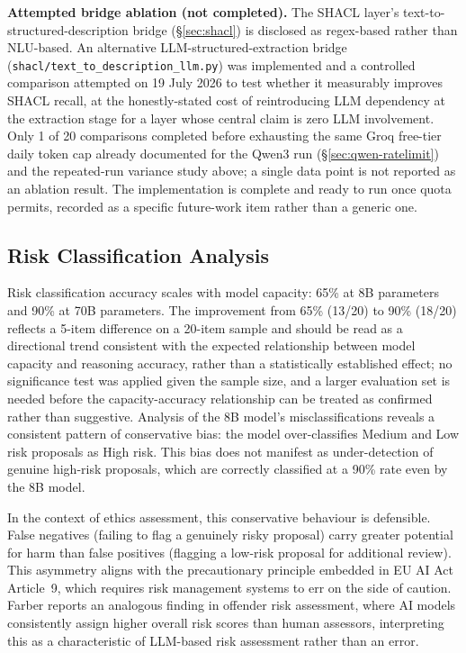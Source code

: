 \textbf{Attempted bridge ablation (not completed).} The SHACL layer's text-to-structured-description bridge (\S\ref{sec:shacl}) is disclosed as regex-based rather than NLU-based. An alternative LLM-structured-extraction bridge (\texttt{shacl/text\_to\_description\_llm.py}) was implemented and a controlled comparison attempted on 19 July 2026 to test whether it measurably improves SHACL recall, at the honestly-stated cost of reintroducing LLM dependency at the extraction stage for a layer whose central claim is zero LLM involvement. Only 1 of 20 comparisons completed before exhausting the same Groq free-tier daily token cap already documented for the Qwen3 run (\S\ref{sec:qwen-ratelimit}) and the repeated-run variance study above; a single data point is not reported as an ablation result. The implementation is complete and ready to run once quota permits, recorded as a specific future-work item rather than a generic one.


\subsection{Risk Classification Analysis}
\label{sec:risk-classification-analysis}

Risk classification accuracy scales with model capacity: 65\% at 8B parameters and 90\% at 70B parameters. The improvement from 65\% (13/20) to 90\% (18/20) reflects a 5-item difference on a 20-item sample and should be read as a directional trend consistent with the expected relationship between model capacity and reasoning accuracy, rather than a statistically established effect; no significance test was applied given the sample size, and a larger evaluation set is needed before the capacity-accuracy relationship can be treated as confirmed rather than suggestive. Analysis of the 8B model's misclassifications reveals a consistent pattern of conservative bias: the model over-classifies Medium and Low risk proposals as High risk. This bias does not manifest as under-detection of genuine high-risk proposals, which are correctly classified at a 90\% rate even by the 8B model.

In the context of ethics assessment, this conservative behaviour is defensible. False negatives (failing to flag a genuinely risky proposal) carry greater potential for harm than false positives (flagging a low-risk proposal for additional review). This asymmetry aligns with the precautionary principle embedded in EU AI Act Article~9, which requires risk management systems to err on the side of caution. Farber \cite{farber2025} reports an analogous finding in offender risk assessment, where AI models consistently assign higher overall risk scores than human assessors, interpreting this as a characteristic of LLM-based risk assessment rather than an error.

